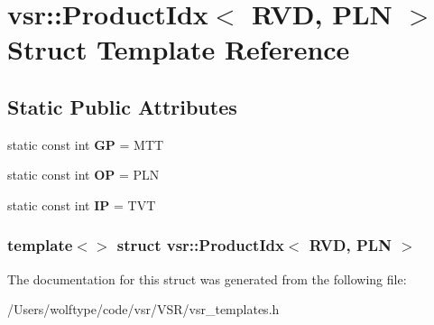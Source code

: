 \hypertarget{structvsr_1_1_product_idx_3_01_r_v_d_00_01_p_l_n_01_4}{\section{vsr\-:\-:Product\-Idx$<$ R\-V\-D, P\-L\-N $>$ Struct Template Reference}
\label{structvsr_1_1_product_idx_3_01_r_v_d_00_01_p_l_n_01_4}
}
\subsection*{Static Public Attributes}
\begin{DoxyCompactItemize}
\item 
\hypertarget{structvsr_1_1_product_idx_3_01_r_v_d_00_01_p_l_n_01_4_a7a4920c30a2ec024443fa7356109c179}{static const int {\bfseries G\-P} = M\-T\-T}\label{structvsr_1_1_product_idx_3_01_r_v_d_00_01_p_l_n_01_4_a7a4920c30a2ec024443fa7356109c179}

\item 
\hypertarget{structvsr_1_1_product_idx_3_01_r_v_d_00_01_p_l_n_01_4_add4b48bff2c79fe181008e6c67111584}{static const int {\bfseries O\-P} = P\-L\-N}\label{structvsr_1_1_product_idx_3_01_r_v_d_00_01_p_l_n_01_4_add4b48bff2c79fe181008e6c67111584}

\item 
\hypertarget{structvsr_1_1_product_idx_3_01_r_v_d_00_01_p_l_n_01_4_a4ba0c7a09912097df5622814feee0a44}{static const int {\bfseries I\-P} = T\-V\-T}\label{structvsr_1_1_product_idx_3_01_r_v_d_00_01_p_l_n_01_4_a4ba0c7a09912097df5622814feee0a44}

\end{DoxyCompactItemize}
\subsubsection*{template$<$$>$ struct vsr\-::\-Product\-Idx$<$ R\-V\-D, P\-L\-N $>$}



The documentation for this struct was generated from the following file\-:\begin{DoxyCompactItemize}
\item 
/\-Users/wolftype/code/vsr/\-V\-S\-R/vsr\-\_\-templates.\-h\end{DoxyCompactItemize}
